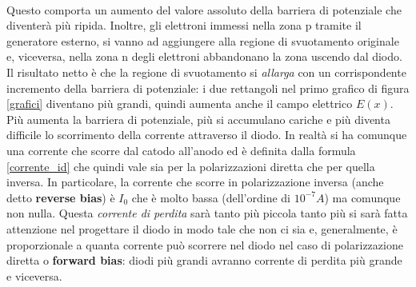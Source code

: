\documentclass[12pt, a4paper]{report}
\begin{document}
\\Questo comporta un aumento del valore assoluto della barriera di potenziale che diventerà più ripida. Inoltre, gli elettroni immessi nella zona p tramite il generatore esterno, si vanno ad aggiungere alla regione di svuotamento originale e, viceversa, nella zona n degli elettroni abbandonano la zona uscendo dal diodo. Il risultato netto è che la regione di svuotamento si \textit{allarga} con un corrispondente incremento della barriera di potenziale: i due rettangoli nel primo grafico di figura \ref{grafici} diventano più grandi, quindi aumenta anche il campo elettrico $E(x)$. Più aumenta la barriera di potenziale, più si accumulano cariche e più diventa difficile lo scorrimento della corrente attraverso il diodo. In realtà si ha comunque una corrente che scorre dal catodo all'anodo ed è definita dalla formula \eqref{corrente_id} che quindi vale sia per la polarizzazioni diretta che per quella inversa. In particolare, la corrente che scorre in polarizzazione inversa (anche detto \textbf{reverse bias}) è $I_{0}$ che è molto bassa (dell'ordine di $10^{-7} A$) ma comunque non nulla. Questa \textit{corrente di perdita} sarà tanto più piccola tanto più si sarà fatta attenzione nel progettare il diodo in modo tale che non ci sia e, generalmente, è proporzionale a quanta corrente può scorrere nel diodo nel caso di polarizzazione diretta o \textbf{forward bias}: diodi più grandi avranno corrente di perdita più grande e viceversa.
\end{document}
